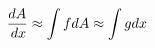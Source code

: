\documentclass[preview]{standalone}
\begin{document}
\begin{align*}
{dA \over \, dx} \approx \int f dA \approx \int g dx
\end{align*}
\end{document}
